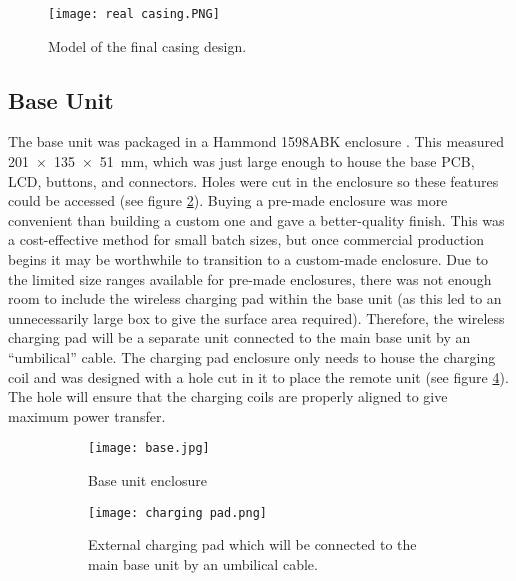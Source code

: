 \begin{figure}[h!]
	\centering
	\texttt{[image: real casing.PNG]}
	\caption{Model of the final casing design.}
	\label{fig: real casing}
\end{figure}





\subsection{Base Unit}\label{base casing}



The base unit was packaged in a Hammond 1598ABK enclosure \cite{hammond}. This measured \SI{201x135x51}{\milli\metre}, which was just large enough to house the base PCB, LCD, buttons, and connectors. Holes were cut in the enclosure so these features could be accessed (see figure \ref{fig: base enclosure}). Buying a pre-made enclosure was more convenient than building a custom one and gave a better-quality finish. This was a cost-effective method for small batch sizes, but once commercial production begins it may be worthwhile to transition to a custom-made enclosure. Due to the limited size ranges available for pre-made enclosures, there was not enough room to include the wireless charging pad within the base unit (as this led to an unnecessarily large box to give the surface area required). Therefore, the wireless charging pad will be a separate unit connected to the main base unit by an ``umbilical'' cable. The charging pad enclosure only needs to house the charging coil and was designed with a hole cut in it to place the remote unit (see figure \ref{fig: charging pad}). The hole will ensure that the charging coils are properly aligned to give maximum power transfer.

\begin{figure}[htb]
	\centering
	\begin{subfigure}[t]{0.4\linewidth}
		\texttt{[image: base.jpg]}
		\caption{Base unit enclosure}
		\label{fig: base enclosure}
	\end{subfigure}
	\begin{subfigure}[t]{0.4\linewidth}
		\texttt{[image: charging pad.png]}
		\caption{External charging pad which will be connected to the main base unit by an umbilical cable.}
		\label{fig: charging pad}
	\end{subfigure}
	\caption{}
\end{figure}